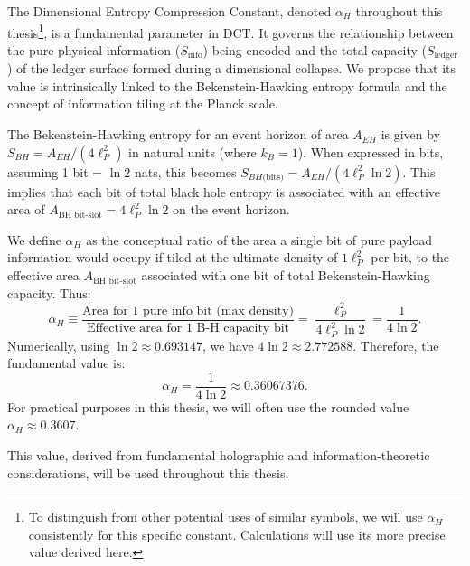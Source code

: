 \documentclass[a4paper, 12pt, oneside]{book}
\numberwithin{equation}{chapter}
\begin{document}
The Dimensional Entropy Compression Constant, denoted $\alpha_H$ throughout this thesis\footnote{To distinguish from other potential uses of similar symbols, we will use $\alpha_H$ consistently for this specific constant. Calculations will use its more precise value derived here.}, is a fundamental parameter in DCT. It governs the relationship between the pure physical information ($S_{\text{info}}$) being encoded and the total capacity ($S_{\text{ledger}}$) of the ledger surface formed during a dimensional collapse. We propose that its value is intrinsically linked to the Bekenstein-Hawking entropy formula and the concept of information tiling at the Planck scale.

The Bekenstein-Hawking entropy for an event horizon of area $A_{EH}$ is given by $S_{BH} = A_{EH}/(4\ell_P^2)$ in natural units (where $k_B=1$). When expressed in bits, assuming 1 bit = $\ln 2$ nats, this becomes $S_{BH \text{(bits)}} = A_{EH}/(4\ell_P^2 \ln 2)$. This implies that each bit of total black hole entropy is associated with an effective area of $A_{\text{BH bit-slot}} = 4\ell_P^2 \ln 2$ on the event horizon.

We define $\alpha_H$ as the conceptual ratio of the area a single bit of pure payload information would occupy if tiled at the ultimate density of $1 \ell_P^2$ per bit, to the effective area $A_{\text{BH bit-slot}}$ associated with one bit of total Bekenstein-Hawking capacity.
Thus:
\[
    \alpha_H \equiv \frac{\text{Area for 1 pure info bit (max density)}}{\text{Effective area for 1 B-H capacity bit}} = \frac{\ell_P^2}{4\ell_P^2 \ln 2} = \frac{1}{4 \ln 2}.
\]
Numerically, using $\ln 2 \approx 0.693147$, we have $4 \ln 2 \approx 2.772588$. Therefore, the fundamental value is:
\[
    \boxed{\alpha_H = \frac{1}{4 \ln 2} \approx 0.36067376}.
\]
For practical purposes in this thesis, we will often use the rounded value $\alpha_H \approx 0.3607$.

This value, derived from fundamental holographic and information-theoretic considerations, will be used throughout this thesis.
\end{document}
